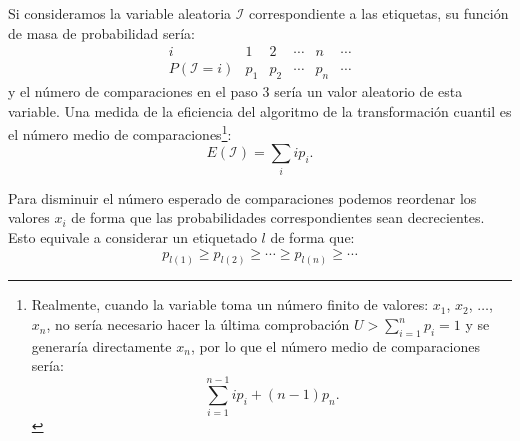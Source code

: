 \documentclass[
]{book}
\theoremstyle{break}
\theoremstyle{nonumberplain}
\begin{document}
Si consideramos la variable aleatoria \(\mathcal{I}\) correspondiente a las etiquetas, su función de masa de probabilidad sería:
\[\begin{array}{l|ccccc}
i & 1 & 2 & \cdots & n & \cdots \\ \hline
P\left( \mathcal{I}=i\right) & p_{1} & p_{2} & \cdots & p_{n} & \cdots 
\end{array}\]
y el número de comparaciones en el paso 3 sería un valor aleatorio de esta variable.
Una medida de la eficiencia del algoritmo de la transformación cuantil es el número medio de comparaciones\footnote{Realmente, cuando la variable toma un número finito de valores: \(x_{1}\), \(x_{2}\), \(\ldots\), \(x_{n}\), no sería necesario hacer
  la última comprobación \(U>\sum_{i=1}^{n}p_{i}=1\) y se generaría directamente \(x_{n}\), por lo que el número medio de comparaciones sería: \[\sum_{i=1}^{n-1}ip_{i}+\left( n-1\right)  p_{n}.\]}:
\[E\left( \mathcal{I}\right) =\sum_i ip_{i}.\]

Para disminuir el número esperado de comparaciones podemos
reordenar los valores \(x_{i}\) de forma que las probabilidades
correspondientes sean decrecientes. Esto equivale a considerar
un etiquetado \(l\) de forma que:
\[p_{l\left( 1\right) }\geq p_{l\left( 2\right) }\geq \cdots \geq p_{l\left(
n\right) }\geq \cdots\]
\end{document}
